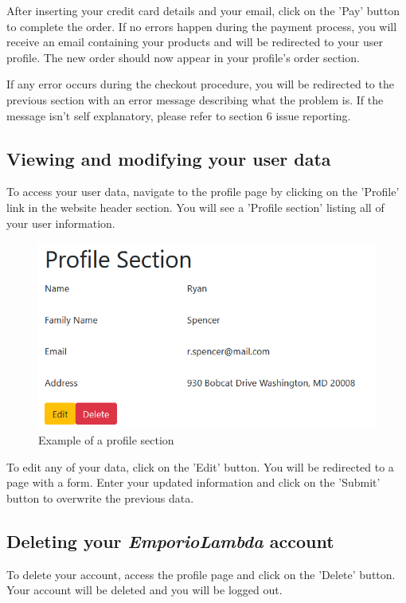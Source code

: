 After inserting your credit card details and your email, click on the 'Pay' button to complete the order. If no errors happen during the payment process, you will receive an email containing your products and will be redirected to your user profile. The new order should now appear in your profile's order section. 

If any error occurs during the checkout procedure, you will be redirected to the previous section with an error message describing what the problem is. If the message isn't self explanatory, please refer to section 6 issue reporting.

\subsection{Viewing and modifying your user data}
To access your user data, navigate to the profile page by clicking on the 'Profile' link in the website header section. You will see a 'Profile section' listing all of your user information.

\begin{figure}[H]
\centering
\includegraphics[scale=0.6]{res/Immagini/ProfilePage}
\caption{Example of a profile section}
\end{figure}

To edit any of your data, click on the 'Edit' button. You will be redirected to a page with a form. Enter your updated information and click on the 'Submit' button to overwrite the previous data.

\subsection{Deleting your \textit{EmporioLambda} account}
To delete your account, access the profile page and click on the 'Delete' button. Your account will be deleted and you will be logged out.

